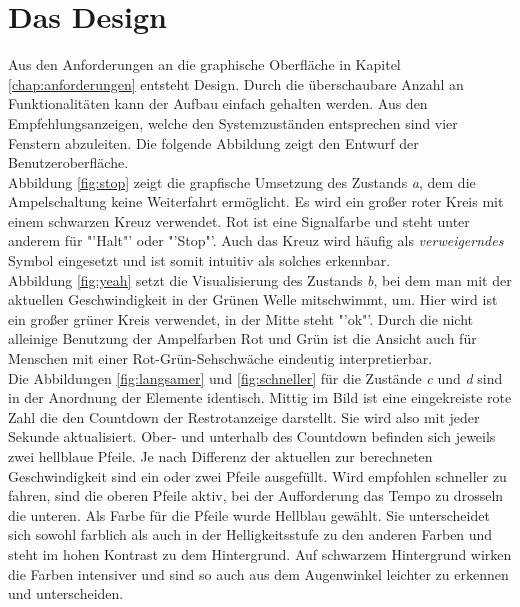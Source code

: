 \section{Das Design}
Aus den Anforderungen an die graphische Oberfläche in Kapitel \ref{chap:anforderungen} entsteht Design. Durch die überschaubare Anzahl an Funktionalitäten kann der Aufbau einfach gehalten werden. Aus den Empfehlungsanzeigen, welche den Systemzuständen entsprechen sind vier Fenstern abzuleiten. Die folgende Abbildung zeigt den Entwurf der Benutzeroberfläche. \\
Abbildung \ref{fig:stop} zeigt die grapfische Umsetzung des Zustands \textit{a}, dem die Ampelschaltung keine Weiterfahrt ermöglicht. Es wird ein großer roter Kreis mit einem schwarzen Kreuz verwendet. Rot ist eine Signalfarbe und steht unter anderem für "'Halt"' oder "'Stop"'. Auch das Kreuz wird häufig als \textit{verweigerndes} Symbol eingesetzt und ist somit intuitiv als solches erkennbar.\\
Abbildung \ref{fig:yeah} setzt die Visualisierung des Zustands \textit{b}, bei dem man mit der aktuellen Geschwindigkeit in der Grünen Welle mitschwimmt, um. Hier wird ist ein großer grüner Kreis verwendet, in der Mitte steht "'ok"'. Durch die nicht alleinige Benutzung der Ampelfarben Rot und Grün ist die Ansicht auch für Menschen mit einer Rot-Grün-Sehschwäche eindeutig interpretierbar.\\
Die Abbildungen \ref{fig:langsamer} und \ref{fig:schneller} für die Zustände \textit{c} und \textit{d} sind in der Anordnung der Elemente identisch. Mittig im Bild ist eine eingekreiste rote Zahl die den Countdown der Restrotanzeige darstellt. Sie wird also mit jeder Sekunde aktualisiert. Ober- und unterhalb des Countdown befinden sich jeweils zwei hellblaue Pfeile. Je nach Differenz der aktuellen zur berechneten Geschwindigkeit sind ein oder zwei Pfeile ausgefüllt. Wird empfohlen schneller zu fahren, sind die oberen Pfeile aktiv, bei der Aufforderung das Tempo zu drosseln die unteren. Als Farbe für die Pfeile wurde Hellblau gewählt. Sie unterscheidet sich sowohl farblich als auch in der Helligkeitsstufe zu den anderen Farben und steht im hohen Kontrast zu dem Hintergrund. Auf schwarzem Hintergrund wirken die Farben intensiver und sind so auch aus dem Augenwinkel leichter zu erkennen und unterscheiden. 

